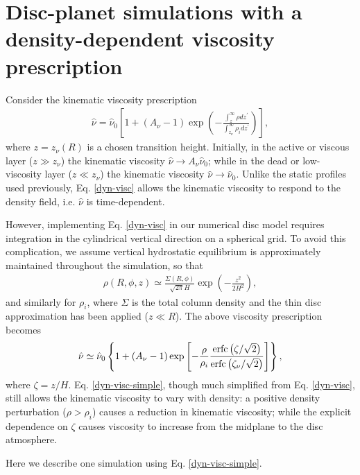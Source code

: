 \section{Disc-planet simulations with a density-dependent viscosity
  prescription} 
Consider the kinematic viscosity prescription 
\begin{align}\label{dyn-visc}
  \hat{\nu} = \hat{\nu}_0\left[1 + \left(A_\nu -
    1\right)\exp{\left(-\frac{\int_z^\infty\rho
        dz^\prime}{\int_{z_\nu}^\infty\rho_i dz^\prime}\right)}\right],  
\end{align}
where $z=z_\nu(R)$ is a chosen transition height. Initially, in the active
or viscous layer ($z\gg z_\nu$) the kinematic viscosity $\hat{\nu}\to
A_\nu\hat{\nu}_0$; while in the dead or low-viscosity layer ($z\ll
z_\nu$) the kinematic viscosity $\hat{\nu}\to\hat{\nu}_0$. Unlike the
static profiles used previously, Eq. \ref{dyn-visc} allows the
kinematic viscosity to respond to the density
field, i.e. $\hat{\nu}$ is time-dependent.  

However, implementing Eq. \ref{dyn-visc} in our numerical disc model
requires integration in the cylindrical vertical direction on a
spherical grid. To avoid this complication, we  
assume vertical hydrostatic equilibrium is approximately maintained 
throughout the simulation, so that 
\begin{align}
  \rho(R,\phi, z) \simeq
  \frac{\Sigma(R,\phi)}{\sqrt{2\pi}H}\exp{\left(-\frac{z^2}{2H^2}\right)},  
\end{align}
and similarly for $\rho_i$, where $\Sigma$ is the total column
density and the thin disc approximation has been applied ($z\ll R$). 
The above viscosity prescription becomes
\begin{align}\label{dyn-visc-simple}
   \hat{\nu} \simeq \hat{\nu}_0\left\{1 + \left(A_\nu -
  1\right)\exp{\left[-\frac{\rho}{\rho_i}\frac{\operatorname{erfc}\left(\zeta/\sqrt{2}\right)}{\operatorname{erfc}\left(\zeta_\nu/\sqrt{2}\right)}\right]}\right\}, 
\end{align} 
where $\zeta = z/H$. Eq. \ref{dyn-visc-simple}, though much simplified
from  Eq. \ref{dyn-visc}, still allows the kinematic 
viscosity to vary with density: a
positive density perturbation ($\rho>\rho_i$) causes a reduction in
kinematic viscosity; while the explicit dependence on
$\zeta$ causes viscosity to increase from the midplane to the disc
atmosphere.    

Here we describe one simulation using Eq. \ref{dyn-visc-simple}. 
